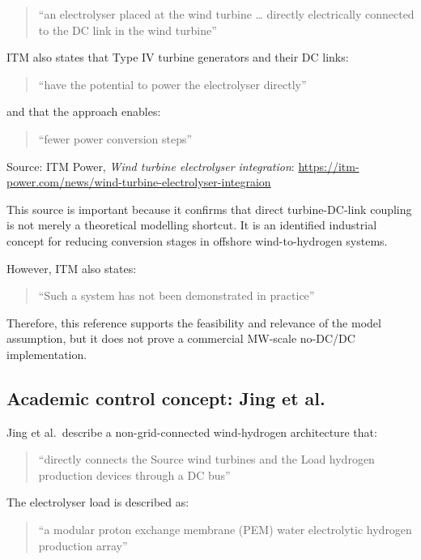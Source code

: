 \documentclass[
  letterpaper,
  DIV=11,
  numbers=noendperiod]{scrartcl}
\begin{document}
\begin{quote}
``an electrolyser placed at the wind turbine \ldots{} directly
electrically connected to the DC link in the wind turbine''
\end{quote}

ITM also states that Type IV turbine generators and their DC links:

\begin{quote}
``have the potential to power the electrolyser directly''
\end{quote}

and that the approach enables:

\begin{quote}
``fewer power conversion steps''
\end{quote}

Source: ITM Power, \emph{Wind turbine electrolyser integration}:
\url{https://itm-power.com/news/wind-turbine-electrolyser-integraion}

This source is important because it confirms that direct turbine-DC-link
coupling is not merely a theoretical modelling shortcut. It is an
identified industrial concept for reducing conversion stages in offshore
wind-to-hydrogen systems.

However, ITM also states:

\begin{quote}
``Such a system has not been demonstrated in practice''
\end{quote}

Therefore, this reference supports the feasibility and relevance of the
model assumption, but it does not prove a commercial MW-scale no-DC/DC
implementation.

\subsection{Academic control concept: Jing et
al.}\label{academic-control-concept-jing-et-al.}

Jing et al.~describe a non-grid-connected wind-hydrogen architecture
that:

\begin{quote}
``directly connects the Source wind turbines and the Load hydrogen
production devices through a DC bus''
\end{quote}

The electrolyser load is described as:

\begin{quote}
``a modular proton exchange membrane (PEM) water electrolytic hydrogen
production array''
\end{quote}
\end{document}
